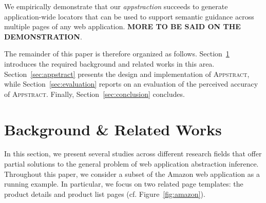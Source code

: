We empirically demonstrate that our \emph{appstraction} succeeds to generate application-wide locators that can be used to support semantic guidance across multiple pages of any web application.
\textbf{MORE TO BE SAID ON THE DEMONSTRATION}.

The remainder of this paper is therefore organized as follows.
Section~\ref{sec:related} introduces the required background and related works in this area.
Section~\ref{sec:appstract} presents the design and implementation of \textsc{Appstract}, while Section~\ref{sec:evaluation} reports on an evaluation of the perceived accuracy of \textsc{Appstract}.
Finally, Section~\ref{sec:conclusion} concludes.

\section{Background \& Related Works}\label{sec:related}
In this section, we present several studies across different research fields that offer partial solutions to the general problem of web application abstraction inference. 
Throughout this paper, we consider a subset of the Amazon web application as a running example.
In particular, we focus on two related page templates: the product details and product list pages (cf. Figure~\ref{fig:amazon}).

